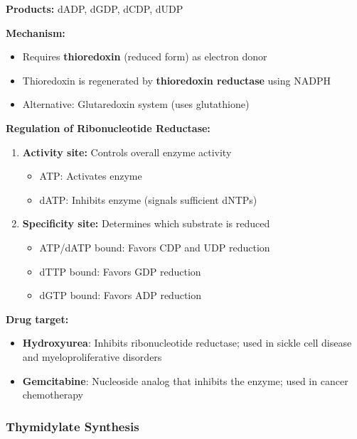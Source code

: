 \textbf{Products:} dADP, dGDP, dCDP, dUDP

\textbf{Mechanism:}
\begin{itemize}
    \item Requires \textbf{thioredoxin} (reduced form) as electron donor
    \item Thioredoxin is regenerated by \textbf{thioredoxin reductase} using NADPH
    \item Alternative: Glutaredoxin system (uses glutathione)
\end{itemize}

\textbf{Regulation of Ribonucleotide Reductase:}

\begin{enumerate}
    \item \textbf{Activity site:} Controls overall enzyme activity
    \begin{itemize}
        \item ATP: Activates enzyme
        \item dATP: Inhibits enzyme (signals sufficient dNTPs)
    \end{itemize}
    
    \item \textbf{Specificity site:} Determines which substrate is reduced
    \begin{itemize}
        \item ATP/dATP bound: Favors CDP and UDP reduction
        \item dTTP bound: Favors GDP reduction
        \item dGTP bound: Favors ADP reduction
    \end{itemize}
\end{enumerate}

\begin{tcolorbox}[colback=yellow!10, colframe=yellow!70!black, title=\textbf{Clinical Significance of Ribonucleotide Reductase}]
\textbf{Drug target:}
\begin{itemize}
    \item \textbf{Hydroxyurea}: Inhibits ribonucleotide reductase; used in sickle cell disease and myeloproliferative disorders
    \item \textbf{Gemcitabine}: Nucleoside analog that inhibits the enzyme; used in cancer chemotherapy
\end{itemize}
\end{tcolorbox}

\subsubsection{Thymidylate Synthesis}

